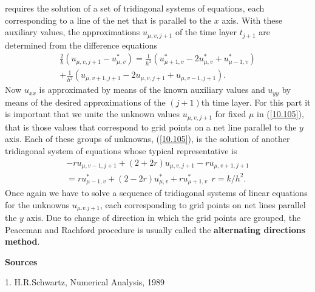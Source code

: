 \documentclass[11pt]{article}
\begin{document}
requires the solution of a set of tridiagonal systems of equations,
each corresponding to a line of the net that is parallel to the $x$
axis. With these auxiliary values, the approximations $u_{\mu,v,j+1}$
of the time layer $t_{j+1}$ are determined from the difference
equations
\begin{eqnarray}
\frac{2}{k}(u_{\mu,v,j+1}-u_{\mu,v}^\ast) =
\frac{1}{h^2}(u_{\mu+1,v}^\ast - 2 u_{\mu,v}^\ast + u_{\mu-1,v}^\ast)
\nonumber \\ +\frac{1}{h^2}(u_{\mu,v+1,j+1} - 2u_{\mu,v,j+1} +
u_{\mu,v-1,j+1}).
\label{10.105} 
\end{eqnarray}
Now $u_{xx}$ is approximated by means of the known auxiliary values
and $u_{yy}$ by means of the desired approximations of the $(j+1)$th
time layer. For this part it is important that we unite the unknown
values $u_{\mu,v,j+1}$ for fixed $\mu$ in (\ref{10.105}), that is
those values that correspond to grid points on a net line parallel to
the $y$ axis. Each of these groups of unknowns, (\ref{10.105}), is the
solution of another tridiagonal system of equations whose typical
representative is
\begin{eqnarray}
-ru_{\mu,v-1,j+1}+(2+2r)u_{\mu,v,j+1}-ru_{\mu,v+1,j+1} \nonumber
\\ = ru_{\mu-1,v}^\ast+(2-2r)u_{\mu,v}^\ast+ru_{\mu+1,v}^\ast \ \ r = k/h^2.
\label{10.106} 
\end{eqnarray}
Once again we have to solve a sequence of tridiagonal systems of
linear equations for the unknowns $u_{\mu.v.j+1}$, each corresponding
to grid points on net lines parallel the $y$ axis. Due to change of
direction in which the grid points are grouped, the Peaceman and
Rachford procedure is usually called the {\bf alternating directions
method}.

\vspace{5mm}
\begin{center} \Large\textbf{Sources} \end{center}
\vspace{5mm}
1. H.R.Schwartz, Numerical Analysis, 1989 
\end{document}
